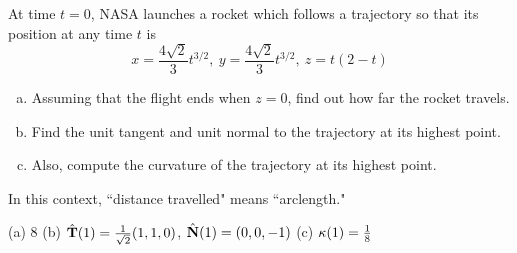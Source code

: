 \begin{question}[M317 2004A] %
At time $t=0$, NASA launches a rocket which follows a
trajectory so that its position at any time $t$ is
\begin{equation*}
x=\frac{4\sqrt{2}}{3}t^{3/2},\ y=\frac{4\sqrt{2}}{3}t^{3/2},\ z=t(2-t)
\end{equation*}
\begin{enumerate}[(a)]
\item
Assuming that the flight ends when $z=0$, find out how far
the rocket travels.
\item 
Find the unit tangent and unit normal to the trajectory
at its highest point.
\item 
Also, compute the curvature of the trajectory at its highest point.
\end{enumerate}

\end{question}

\begin{hint} 
	In this context, ``distance travelled" means ``arclength."
\end{hint}

\begin{answer} 
(a) $8$\qquad
(b) $\hat{\mathbf{T}}(1)=\frac{1}{\sqrt{2}}(1,1,0)$,
    $\hat{\mathbf{N}}(1) = (0,0,-1)$\qquad
(c) $\kappa(1) =\frac{1}{8}$
\end{answer}

